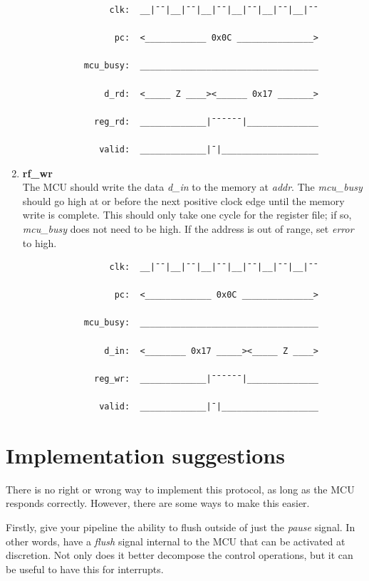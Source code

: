 \documentclass[10pt,a4paper]{article}
\begin{document}
\begin{enumerate}
        \begin{verbatim}
                 clk:  __|¯¯|__|¯¯|__|¯¯|__|¯¯|__|¯¯|__|¯¯

                  pc:  <____________ 0x0C _______________>

            mcu_busy:  ___________________________________

                d_rd:  <_____ Z ____><______ 0x17 _______>

              reg_rd:  _____________|¯¯¯¯¯¯|______________

               valid:  _____________|¯|___________________
        \end{verbatim}

    \item\textbf{rf\_wr}\\
    The MCU should write the data \emph{d\_in} to the memory at \emph{addr}. The \emph{mcu\_busy} should go
    high at or before the next positive clock edge until the memory write is complete. This should
    only take one cycle for the register file; if so, \emph{mcu\_busy} does not need to be high.
    If the address is out of range, set \emph{error} to high.

        \begin{verbatim}
                 clk:  __|¯¯|__|¯¯|__|¯¯|__|¯¯|__|¯¯|__|¯¯

                  pc:  <_____________ 0x0C ______________>

            mcu_busy:  ___________________________________

                d_in:  <________ 0x17 _____><_____ Z ____> 

              reg_wr:  _____________|¯¯¯¯¯¯|______________

               valid:  _____________|¯|___________________
        \end{verbatim}

\end{enumerate}

\newpage
\section{Implementation suggestions}
There is no right or wrong way to implement this protocol, as long as the MCU responds correctly.
However, there are some ways to make this easier.

Firstly, give your pipeline the ability to flush
outside of just the \emph{pause} signal. In other words, have a \emph{flush} signal internal to the
MCU that can be activated at discretion. Not only does it better decompose the control operations,
but it can be useful to have this for interrupts.
\end{document}
